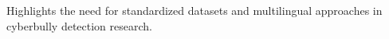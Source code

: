 Highlights the need for standardized datasets and multilingual approaches in cyberbully detection research.